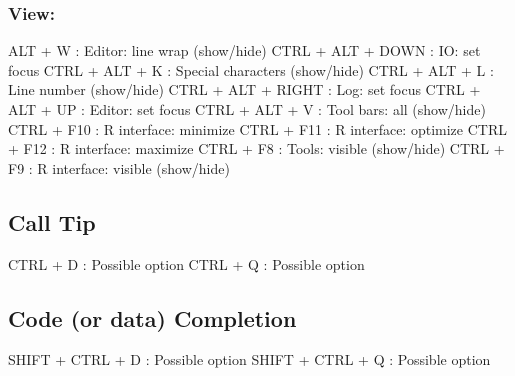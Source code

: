 \subsubsection{View:}

\vspace{-0.5cm}
\begin{Rtables}[caption={[View menu keyboard shortcuts]
    View menu keyboard shortcuts},
  label=menu:view]
  ALT  + W                : Editor: line wrap (show/hide)
  CTRL + ALT + DOWN       : IO: set focus
  CTRL + ALT + K          : Special characters (show/hide)
  CTRL + ALT + L          : Line number (show/hide)
  CTRL + ALT + RIGHT      : Log: set focus
  CTRL + ALT + UP         : Editor: set focus
  CTRL + ALT + V          : Tool bars: all (show/hide)
  CTRL + F10              : R interface: minimize
  CTRL + F11              : R interface: optimize
  CTRL + F12              : R interface: maximize
  CTRL + F8               : Tools: visible (show/hide)
  CTRL + F9               : R interface: visible (show/hide)
\end{Rtables}


\hypertarget{basic_card_calltip}{}
\subsection{Call Tip}

\vspace{-0.5cm}
\begin{Rtables}[caption={[Call tip keyboard shortcuts]
    Call tip keyboard shortcuts},
  label=shortcut:calltip]
  CTRL + D                : Possible option
  CTRL + Q                : Possible option
\end{Rtables}


\hypertarget{basic_card_codecompletion}{}
\subsection{Code (or data) Completion}

\vspace{-0.5cm}
\begin{Rtables}[caption={[Code completion keyboard shortcuts]
    Code completion keyboard shortcuts},
  label=shortcut:codecompletion]
  SHIFT + CTRL + D        : Possible option
  SHIFT + CTRL + Q        : Possible option
\end{Rtables}


